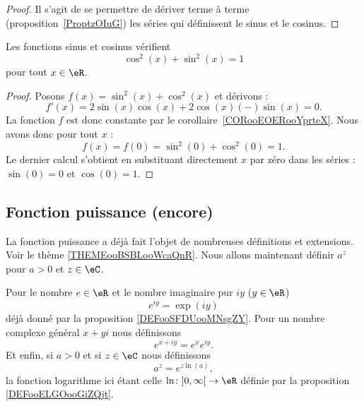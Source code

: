 \begin{proof}
    Il s'agit de se permettre de dériver terme à terme (proposition~\ref{ProptzOIuG}) les séries qui définissent le sinus et le cosinus.
\end{proof}

\begin{lemma}       \label{LEMooAEFPooGSgOkF}
    Les fonctions sinus et cosinus vérifient
    \begin{equation}
        \cos^2(x)+\sin^2(x)=1
    \end{equation}
    pour tout \( x\in \eR\).
\end{lemma}

\begin{proof}
    Posons \( f(x)=\sin^2(x)+\cos^2(x)\) et dérivons :
    \begin{equation}
        f'(x)=2\sin(x)\cos(x)+2\cos(x)(-)\sin(x)=0.
    \end{equation}
    La fonction \( f\) est donc constante par le corollaire~\ref{CORooEOERooYprteX}. Nous avons donc pour tout \( x\) :
    \begin{equation}
        f(x)=f(0)=\sin^2(0)+\cos^2(0)=1.
    \end{equation}
    Le dernier calcul s'obtient en substituant directement \( x\) par zéro dans les séries : \( \sin(0)=0\) et \( \cos(0)=1\).
\end{proof}

\subsection{Fonction puissance (encore)}

La fonction puissance a déjà fait l'objet de nombreuses définitions et extensions. Voir le thème \ref{THEMEooBSBLooWcaQnR}. Nous allons maintenant définir \( a^z\) pour \( a>0\) et \( z\in \eC\). 

\begin{definition}      \label{DEFooRBTDooNLcWGj}
    Pour le nombre \( e\in \eR\) et le nombre imaginaire pur \( iy\) (\( y\in \eR\))
    \begin{equation}
        e^{iy}=\exp(iy)
    \end{equation}
    déjà donné par la proposition \ref{DEFooSFDUooMNsgZY}. Pour un nombre complexe général \( x+yi\) nous définissons
    \begin{equation}
        e^{x+iy}= e^{x} e^{iy}.
    \end{equation}
    Et enfin, si \( a>0\) et si \( z\in \eC\) nous définissons
    \begin{equation}
        a^z= e^{z\ln(a)},
    \end{equation}
    la fonction logarithme ici étant celle \( \ln\colon \mathopen] 0 , \infty \mathclose[\to \eR\) définie par la proposition \ref{DEFooELGOooGiZQjt}.
\end{definition}

